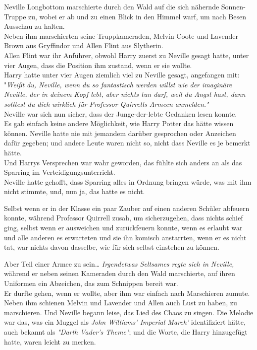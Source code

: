 {Neville Longbottom marschierte durch den Wald auf die sich nähernde Sonnen-Truppe zu, wobei er ab und zu einen Blick in den Himmel warf, um nach Besen Ausschau zu halten.\\ Neben ihm marschierten seine Truppkameraden, Melvin Coote und Lavender Brown aus Gryffindor und Allen Flint aus Slytherin.\\ Allen Flint war ihr Anführer, obwohl Harry zuerst zu Neville gesagt hatte, unter vier Augen, dass die Position ihm zustand, wenn er sie wollte.\\ Harry hatte unter vier Augen ziemlich viel zu Neville gesagt, angefangen mit:\\ "\emph{Weißt du, Neville, wenn du so fantastisch werden willst wie der imaginäre Neville,} \emph{der in deinem Kopf lebt, aber nichts tun darf, weil du Angst hast, dann solltest du dich wirklich für Professor Quirrells Armeen anmelden."}\\ Neville war sich nun sicher, dass der Junge-der-lebte Gedanken lesen konnte.\\ Es gab einfach keine andere Möglichkeit, wie Harry Potter das hätte wissen können. Neville hatte nie mit jemandem darüber gesprochen oder Anzeichen dafür gegeben; und andere Leute waren nicht so, nicht dass Neville es je bemerkt hätte.\\ Und Harrys Versprechen war wahr geworden, das fühlte sich anders an als das Sparring im Verteidigungsunterricht.\\ Neville hatte gehofft, dass Sparring alles in Ordnung bringen würde, was mit ihm nicht stimmte, und, nun ja, das hatte es nicht.

Selbst wenn er in der Klasse ein paar Zauber auf einen anderen Schüler abfeuern konnte, während Professor Quirrell zusah, um sicherzugehen, dass nichts schief ging, selbst wenn er ausweichen und zurückfeuern konnte, wenn es erlaubt war und alle anderen es erwarteten und sie ihn komisch anstarrten, wenn er es nicht tat, war nichts davon dasselbe, wie für sich selbst einstehen zu können.

Aber Teil einer Armee zu sein… \emph{Irgendetwas Seltsames regte sich in Neville,} während er neben seinen Kameraden durch den Wald marschierte, auf ihren Uniformen ein Abzeichen, das zum Schnippen bereit war.\\ Er durfte gehen, wenn er wollte, aber ihm war einfach nach Marschieren zumute. Neben ihm schienen Melvin und Lavender und Allen auch Lust zu haben, zu marschieren. Und Neville begann leise, das Lied des Chaos zu singen. Die Melodie war das, was ein Muggel als \emph{John Williams' Imperial March'} identifiziert hätte, auch bekannt als \emph{"Darth Vader's Theme"}; und die Worte, die Harry hinzugefügt hatte, waren leicht zu merken.

}
